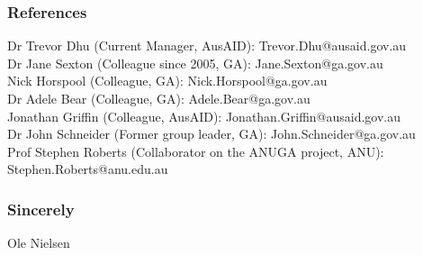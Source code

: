 \documentclass[10pt,a4paper]{article}
\begin{document}
\subsubsection*{References}
Dr Trevor Dhu (Current Manager, AusAID): Trevor.Dhu@ausaid.gov.au\\
Dr Jane Sexton (Colleague since 2005, GA): Jane.Sexton@ga.gov.au\\
Nick Horspool (Colleague, GA): Nick.Horspool@ga.gov.au\\
Dr Adele Bear (Colleague, GA): Adele.Bear@ga.gov.au\\
Jonathan Griffin (Colleague, AusAID): Jonathan.Griffin@ausaid.gov.au\\
Dr John Schneider (Former group leader, GA): John.Schneider@ga.gov.au\\
Prof Stephen Roberts (Collaborator on the ANUGA project, ANU): Stephen.Roberts@anu.edu.au\\

\subsubsection*{Sincerely}
Ole Nielsen
\end{document}

